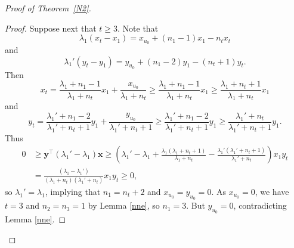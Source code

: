 \documentclass[10pt,a4paper]{amsart}
\numberwithin{equation}{section}
\begin{document}
\begin{proof}[Proof of Theorem~\ref{N2}]
\begin{proof}
Suppose next that $t\ge 3$. 
Note that 
\[
\lambda_1(x_t-x_1)=x_{u_0}+(n_1-1)x_1-n_tx_t
\]
and 
\[
\lambda_1'(y_t-y_1)=y_{u_0}+(n_1-2)y_1-(n_t+1)y_t.
\]
Then 
\[
x_t=\frac{\lambda_1+n_1-1}{\lambda_1+n_t}x_1+\frac{x_{u_0}}{\lambda_1+n_t}\ge \frac{\lambda_1+n_1-1}{\lambda_1+n_t}x_1\ge \frac{\lambda_1+n_t+1}{\lambda_1+n_t}x_1
\]
and 
\[
y_t=\frac{\lambda_1'+n_1-2}{\lambda_1'+n_t+1}y_1+\frac{y_{u_0}}{\lambda_1'+n_t+1}\ge \frac{\lambda_1'+n_1-2}{\lambda_1'+n_t+1}y_1\ge \frac{\lambda_1'+n_t}{\lambda_1'+n_t+1}y_1. 
\]
Thus
\begin{align*}
0& \ge\mathbf{y}^\top(\lambda_1'-\lambda_1)\mathbf{x}  \ge\left(\lambda_1'-\lambda_1+\frac{\lambda_1(\lambda_1+n_t+1)}{\lambda_1+n_t}-\frac{\lambda_1'(\lambda_1'+n_t+1)}{\lambda_1'+n_t}\right)x_1y_t\\
& =\frac{(\lambda_1-\lambda_1')}{(\lambda_1+n_t)(\lambda_1'+n_t)}x_1y_t
 \ge 0, 
\end{align*}
so $\lambda_1'=\lambda_1$, implying that $n_1=n_t+2$ and $x_{u_0}=y_{u_0}=0$. As $x_{u_0}=0$, we have 
$t=3$ and $n_2=n_3=1$ by Lemma \ref{nne},  so $n_1=3$. But $y_{u_0}=0$, contradicting Lemma \ref{nne}. 
%
%
%
%
%
%
%

\end{proof}
\end{proof}
\end{document}
